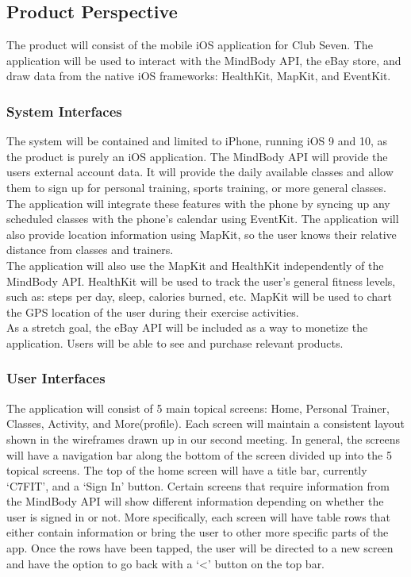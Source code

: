 \documentclass[letterpaper,10pt,titlepage]{article}
\begin{document}
\subsection{Product Perspective}

The product will consist of the mobile iOS application for Club Seven. The application will be used to interact with the MindBody API, the eBay store, and draw data from the native iOS frameworks: HealthKit, MapKit, and EventKit.

\subsubsection{System Interfaces}

The system will be contained and limited to iPhone, running iOS 9 and 10, as the product is purely an iOS application. The MindBody API will provide the users external account data. It will provide the daily available classes and allow them to sign up for personal training, sports training, or more general classes. The application will integrate these features with the phone by syncing up any scheduled classes with the phone’s calendar using EventKit. The application will also provide location information using MapKit, so the user knows their relative distance from classes and trainers.\\

The application will also use the MapKit and HealthKit independently of the MindBody API. HealthKit will be used to track the user’s general fitness levels, such as: steps per day, sleep, calories burned, etc. MapKit will be used to chart the GPS location of the user during their exercise activities.\\

As a stretch goal, the eBay API will be included as a way to monetize the application. Users will be able to see and purchase relevant products.\\

\subsubsection{User Interfaces}

The application will consist of 5 main topical screens: Home, Personal Trainer, Classes, Activity, and More(profile). Each screen will maintain a consistent layout shown in the wireframes drawn up in our second meeting. In general, the screens will have a navigation bar along the bottom of the screen divided up into the 5 topical screens. The top of the home screen will have a title bar, currently ‘C7FIT’, and a ‘Sign In’ button. Certain screens that require information from the MindBody API will show different information depending on whether the user is signed in or not. More specifically, each screen will have table rows that either contain information or bring the user to other more specific parts of the app. Once the rows have been tapped, the user will be directed to a new screen and have the option to go back with a ‘<’ button on the top bar.\\
\end{document}
